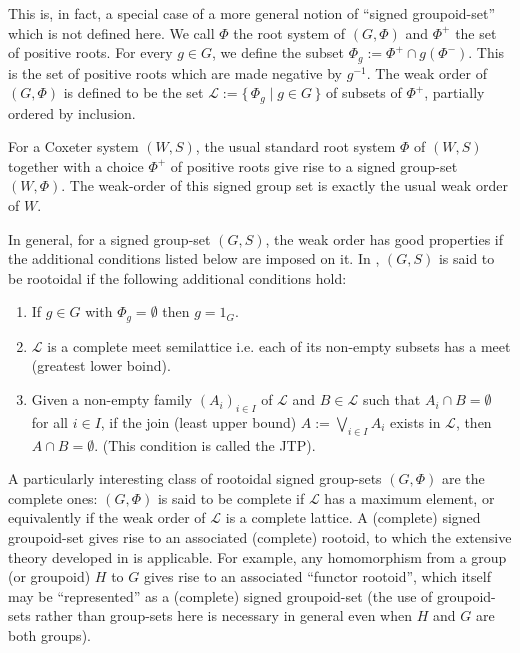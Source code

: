 \documentclass[psamsfonts]{amsart}
\numberwithin{equation}{subsection}
\theoremstyle{plain}
\theoremstyle{definition}
\theoremstyle{remark}
\begin{document}
 This is, in fact, a special case  of a more general notion of ``signed groupoid-set''   which is not defined  here. We call  $\Phi$ the root system of $(G,\Phi)$  and $\Phi^{+}$ the  set of positive roots. For every $g\in G$, we define the subset 
 $ \Phi_{g}:=\Phi^{+}\cap g(\Phi^{-})$. This is the set of positive roots which are made negative by $g^{-1}$.
 The weak order of  $(G,\Phi)$ is defined to be  the set 
 $\mathcal{L}:=\{\, \Phi_{g}\mid g\in G\,\}$ of subsets of $\Phi^{+}$, partially ordered by inclusion.
 
For a Coxeter system $(W,S)$, the usual standard root system $\Phi$ of $(W,S)$ together with a choice $\Phi^{+}$ of positive roots give rise to a signed group-set $(W,\Phi)$.
The weak-order of this signed group set is exactly the usual weak order of $W$.

In general, for a signed group-set $(G,S)$, the weak order has   good properties if the  additional conditions listed below  are imposed on it. In \cite{Dyer}, $(G,S)$ is said to be rootoidal if the following additional conditions hold:

    \begin{enumerate}\item[(4)] If $g\in {G}$ with $\Phi_{g}=\emptyset$ then $g=1_{G}$.
    \item[(5)]  $\mathcal{L}$ is a complete meet semilattice i.e. each of its non-empty subsets  has a meet (greatest lower boind).
        \item[(6)]  Given  a non-empty family $(A_{i})_{i\in I}$ of  $\mathcal{L}$ and $B\in \mathcal{L}$ such that $A_{i}\cap B=\emptyset$ for all $i\in I$, if  the join  (least upper  bound) $A:=\bigvee_{i\in I} A_{i}$ exists in $\mathcal{L}$, then $A\cap B=\emptyset$. (This condition is called the JTP).
       \end{enumerate}
     
      A particularly interesting class of   rootoidal signed group-sets $(G,\Phi)$ are the 
  complete ones: $(G,\Phi)$ is said to be complete if $\mathcal{L}$ has a maximum element, or equivalently if the weak order of  $\mathcal{L}$ is a complete lattice.             A (complete) signed groupoid-set  gives rise to  an associated (complete)  rootoid, to which the extensive theory  
        developed in   \cite{Dyer} is       applicable. For example, any 
       homomorphism from a group (or groupoid)  $H$ to $G$ gives rise to an associated  
       ``functor rootoid'', which itself may be ``represented'' as a (complete) signed groupoid-set (the use of      groupoid-sets rather than group-sets here is necessary in general  even when $H$ and     $G$ are both groups).
       
\end{document}
